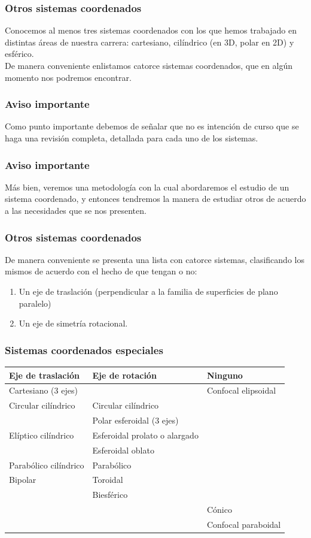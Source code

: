 \documentclass[12pt]{beamer}
\begin{document}
\begin{frame}
\frametitle{Otros sistemas coordenados}
Conocemos al menos tres sistemas coordenados con los que hemos trabajado en distintas áreas de nuestra carrera: cartesiano, cilíndrico (en 3D, polar en 2D) y esférico.
\\
\bigskip
\pause
De manera conveniente enlistamos catorce sistemas coordenados, que en algún momento nos podremos encontrar.
\end{frame}
\begin{frame}
\frametitle{Aviso importante}
Como punto importante debemos de señalar que no es intención de curso que se haga una revisión completa, detallada para cada uno de los sistemas.
\end{frame}
\begin{frame}
\frametitle{Aviso importante}
Más bien, veremos una metodología con la cual abordaremos el estudio de un sistema coordenado, y entonces tendremos la manera de estudiar otros de acuerdo a las necesidades que se nos presenten.
\end{frame}
\begin{frame}
\frametitle{Otros sistemas coordenados}
De manera conveniente se presenta una lista con catorce sistemas, clasificando los mismos de acuerdo con el hecho de que tengan o no:
\begin{enumerate}[<+->]
\item Un eje de traslación (perpendicular a la familia de superficies de plano paralelo)
\item Un eje de simetría rotacional.
\end{enumerate}
\end{frame}
\begin{frame}
\frametitle{Sistemas coordenados especiales}
\fontsize{8}{8}\selectfont
{
\renewcommand{\arraystretch}{1.2}
\begin{table}[H]
\centering
\begin{tabular}{p{3cm} p{4cm} p{2.5cm}}
Eje de traslación & Eje de rotación & Ninguno \\ \hline
Cartesiano ($3$ ejes) & & Confocal elipsoidal \\
Circular cilíndrico & Circular cilíndrico & \\
& Polar esferoidal ($3$ ejes) & \\
Elíptico cilíndrico & Esferoidal prolato o alargado & \\
& Esferoidal oblato & \\
Parabólico cilíndrico & Parabólico & \\
Bipolar & Toroidal & \\
& Biesférico & \\[0.5em]
& & Cónico \\
& & Confocal paraboidal \\
\end{tabular}
\end{table}
}
\end{frame}
\end{document}

